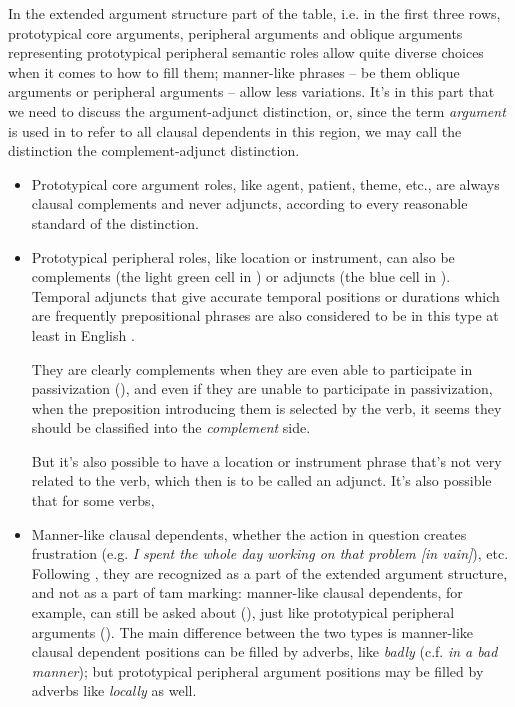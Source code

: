 \documentclass[UTF8, a4paper, oneside, scheme=plain, 12pt]{ctexbook}
\newcommand*{\citesec}[1]{\S~{#1}}
\newcommand*{\term}[1]{\emph{#1}}
\newcommand{\form}[1]{\emph{#1}}
\begin{document}
In the extended argument structure part of the table, i.e. 
in the first three rows,
prototypical core arguments,
peripheral arguments and oblique arguments representing prototypical peripheral semantic roles 
allow quite diverse choices when it comes to how to fill them;
manner-like phrases -- be them oblique arguments or peripheral arguments -- 
allow less variations.
It's in this part that we need to discuss the argument-adjunct distinction, 
or, since the term \term{argument} is used in \citet{dixon2009basic1} to refer to 
all clausal dependents in this region, 
we may call the distinction the complement-adjunct distinction.
\begin{itemize}
    \item Prototypical core argument roles, 
    like agent, patient, theme, etc.,
    are always clausal complements and never adjuncts, 
    according to every reasonable standard of the distinction.
    \item Prototypical peripheral roles, like location or instrument, can also be complements 
    (the light green cell in )
    or adjuncts
    (the blue cell in ).
    Temporal adjuncts that give accurate temporal positions or durations 
    which are frequently prepositional phrases 
    are also considered to be in this type at least in English
    \citep[\citesec{1.5}]{cinque1999adverbs}. 

    They are clearly complements when they are even able to participate in passivization 
    (), 
    and even if they are unable to participate in passivization, 
    when the preposition introducing them is selected by the verb, 
    it seems they should be classified into the \term{complement} side.

    But it's also possible to have a location or instrument phrase that's not very related to the verb, 
    which then is to be called an adjunct.
    It's also possible that for some verbs, 


    \item Manner-like clausal dependents, whether the action in question creates frustration 
    (e.g. \form{I spent the whole day working on that problem [in vain]}), etc.
    Following \citet[\citesec{1.5}]{cinque1999adverbs}, 
    they are recognized as a part of the extended argument structure, 
    and not as a part of \acs{tam} marking:
    manner-like clausal dependents, for example,  
    can still be asked about (), 
    just like prototypical peripheral arguments (). 
    The main difference between the two types 
    is manner-like clausal dependent positions can be filled by adverbs, like 
    \form{badly} (c.f. \form{in a bad manner});
    but prototypical peripheral argument positions may be filled 
    by adverbs like \form{locally} as well.


\end{itemize}
\end{document}
